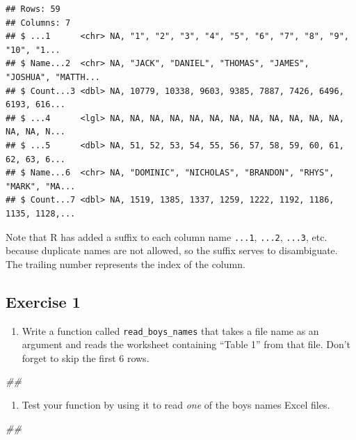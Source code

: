 \documentclass[
]{book}
\newenvironment{Shaded}{\begin{snugshade}}{\end{snugshade}}
\newcommand{\CommentTok}[1]{\textcolor[rgb]{0.56,0.35,0.01}{\textit{#1}}}
\providecommand{\tightlist}{%
  \setlength{\itemsep}{0pt}\setlength{\parskip}{0pt}}
\begin{document}
\begin{verbatim}
## Rows: 59
## Columns: 7
## $ ...1      <chr> NA, "1", "2", "3", "4", "5", "6", "7", "8", "9", "10", "1...
## $ Name...2  <chr> NA, "JACK", "DANIEL", "THOMAS", "JAMES", "JOSHUA", "MATTH...
## $ Count...3 <dbl> NA, 10779, 10338, 9603, 9385, 7887, 7426, 6496, 6193, 616...
## $ ...4      <lgl> NA, NA, NA, NA, NA, NA, NA, NA, NA, NA, NA, NA, NA, NA, N...
## $ ...5      <dbl> NA, 51, 52, 53, 54, 55, 56, 57, 58, 59, 60, 61, 62, 63, 6...
## $ Name...6  <chr> NA, "DOMINIC", "NICHOLAS", "BRANDON", "RHYS", "MARK", "MA...
## $ Count...7 <dbl> NA, 1519, 1385, 1337, 1259, 1222, 1192, 1186, 1135, 1128,...
\end{verbatim}

Note that R has added a suffix to each column name \texttt{...1}, \texttt{...2},
\texttt{...3}, etc. because duplicate names are not allowed, so the suffix serves
to disambiguate. The trailing number represents the index of the column.

\hypertarget{exercise-1-3}{%
\subsection{Exercise 1}\label{exercise-1-3}}

\begin{enumerate}
\def\labelenumi{\arabic{enumi}.}
\tightlist
\item
  Write a function called \texttt{read\_boys\_names} that takes a file name as an argument
  and reads the worksheet containing ``Table 1'' from that file. Don't forget
  to skip the first 6 rows.
\end{enumerate}

\begin{Shaded}
\begin{Highlighting}[]
\CommentTok{\#\# }
\end{Highlighting}
\end{Shaded}

\begin{enumerate}
\def\labelenumi{\arabic{enumi}.}
\setcounter{enumi}{1}
\tightlist
\item
  Test your function by using it to read \emph{one} of the boys names
  Excel files.
\end{enumerate}

\begin{Shaded}
\begin{Highlighting}[]
\CommentTok{\#\# }
\end{Highlighting}
\end{Shaded}
\end{document}
